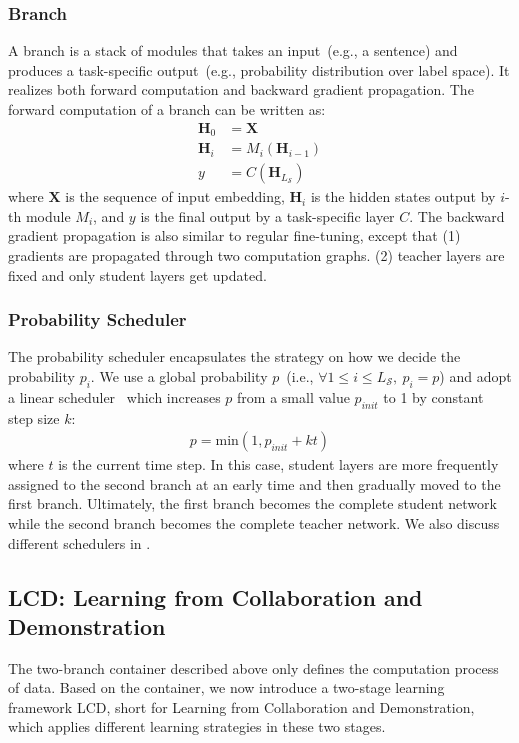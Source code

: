 \subsubsection{Branch}
A branch is a stack of modules that takes an input~(e.g., a sentence) and produces a task-specific output~(e.g., probability distribution over label space). It realizes both forward computation and backward gradient propagation. 
The forward computation of a branch can be written as:
\begin{align}
    \bm{H}_0 &= \bm{X} \\
    \bm{H}_i &= M_i(\bm{H}_{i-1}) \\
    y &= C(\bm{H}_{L_{\mathcal{S}}}) 
\end{align}
where $\bm{X}$ is the sequence of input embedding, $\bm{H}_i$ is the hidden states output by $i$-th module $M_i$, and $y$ is the final output by a task-specific layer $C$. The backward gradient propagation is also similar to regular fine-tuning, except that 
(1) gradients are propagated through two computation graphs. (2) teacher layers are fixed and only student layers get updated.

\subsubsection{Probability Scheduler}
The probability scheduler encapsulates the strategy on how we decide the probability $p_i$. We use a global probability $p$~(i.e., $\forall 1\leq i\leq L_{\mathcal{S}},~p_i=p$) and  adopt a linear scheduler~\cite{theseus} which 
increases $p$ from a small value $p_{init}$ to 1 by constant step size $k$:
\begin{align}
    \nonumber
    p = \text{min}(1, p_{init}+kt)
\end{align}
where $t$ is the current time step. In this case, student layers are more frequently assigned to the second branch at an early time and then gradually moved to the first branch. Ultimately, the first branch becomes the 
complete student network while the second branch becomes the complete teacher network. We also discuss different schedulers in .

\subsection{LCD: Learning from Collaboration and Demonstration}
The two-branch container described above only defines the computation process of data. Based on the container, we now introduce a two-stage learning framework LCD, short for Learning from 
Collaboration and Demonstration, which applies different learning strategies in these two stages.

